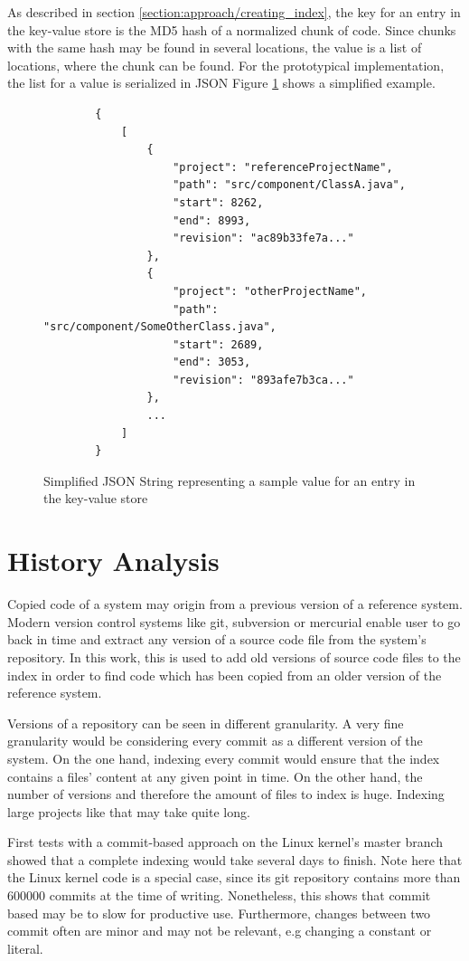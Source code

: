 As described in section \ref{section:approach/creating_index}, the key for an entry in the key-value store is the MD5 hash of a normalized chunk of code.
Since chunks with the same hash may be found in several locations, the value is a list of locations, where the chunk can be found.
For the prototypical implementation, the list for a value is serialized in JSON
Figure \ref{fig:json_serialization} shows a simplified example.

\begin{figure}[h]
	\begin{lstlisting}
		{
			[
				{
					"project": "referenceProjectName",
					"path": "src/component/ClassA.java",
					"start": 8262,
					"end": 8993,
					"revision": "ac89b33fe7a..."
				},
				{
					"project": "otherProjectName",
					"path": "src/component/SomeOtherClass.java",
					"start": 2689,
					"end": 3053,
					"revision": "893afe7b3ca..."
				},
				...
			]
		}
	\end{lstlisting}
	\caption{Simplified JSON String representing a sample value for an entry in the key-value store}\label{fig:json_serialization}
\end{figure}

\section{History Analysis}\label{section:implementation/history_analysis}
Copied code of a system may origin from a previous version of a reference system.
Modern version control systems like git, subversion or mercurial enable user to go back in time and extract any version of a source code file from the system's repository.
In this work, this is used to add old versions of source code files to the index in order to find code which has been copied from an older version of the reference system.

Versions of a repository can be seen in different granularity.
A very fine granularity would be considering every commit as a different version of the system.
On the one hand, indexing every commit would ensure that the index contains a files' content at any given point in time.
On the other hand, the number of versions and therefore the amount of files to index is huge.
Indexing large projects like that may take quite long.

First tests with a commit-based approach on the Linux kernel's master branch showed that a complete indexing would take several days to finish.
Note here that the Linux kernel code is a special case, since its git repository contains more than 600000 commits at the time of writing.
Nonetheless, this shows that commit based may be to slow for productive use.
Furthermore, changes between two commit often are minor and may not be relevant, e.g changing a constant or literal.

